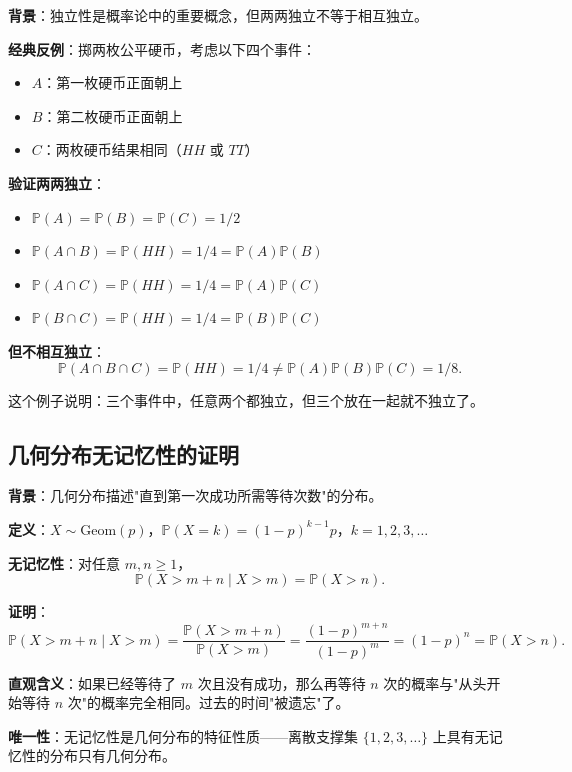 \textbf{背景}：独立性是概率论中的重要概念，但两两独立不等于相互独立。

\textbf{经典反例}：掷两枚公平硬币，考虑以下四个事件：
\begin{itemize}
\item $A$：第一枚硬币正面朝上
\item $B$：第二枚硬币正面朝上
\item $C$：两枚硬币结果相同（$HH$ 或 $TT$）
\end{itemize}

\textbf{验证两两独立}：
\begin{itemize}
\item $\mathbb{P}(A) = \mathbb{P}(B) = \mathbb{P}(C) = 1/2$
\item $\mathbb{P}(A \cap B) = \mathbb{P}(HH) = 1/4 = \mathbb{P}(A) \mathbb{P}(B)$
\item $\mathbb{P}(A \cap C) = \mathbb{P}(HH) = 1/4 = \mathbb{P}(A) \mathbb{P}(C)$
\item $\mathbb{P}(B \cap C) = \mathbb{P}(HH) = 1/4 = \mathbb{P}(B) \mathbb{P}(C)$
\end{itemize}

\textbf{但不相互独立}：
\[
\mathbb{P}(A \cap B \cap C) = \mathbb{P}(HH) = 1/4 \neq \mathbb{P}(A) \mathbb{P}(B) \mathbb{P}(C) = 1/8.
\]

这个例子说明：三个事件中，任意两个都独立，但三个放在一起就不独立了。

\subsection{几何分布无记忆性的证明}\label{sec:derivation-geometric-memoryless}

\textbf{背景}：几何分布描述"直到第一次成功所需等待次数"的分布。

\textbf{定义}：$X \sim \text{Geom}(p)$，$\mathbb{P}(X = k) = (1-p)^{k-1} p$，$k = 1, 2, 3, \ldots$

\textbf{无记忆性}：对任意 $m, n \geq 1$，
\[
\mathbb{P}(X > m+n \mid X > m) = \mathbb{P}(X > n).
\]

\textbf{证明}：
\[
\mathbb{P}(X > m+n \mid X > m) = \frac{\mathbb{P}(X > m+n)}{\mathbb{P}(X > m)} = \frac{(1-p)^{m+n}}{(1-p)^{m}} = (1-p)^{n} = \mathbb{P}(X > n).
\]

\textbf{直观含义}：如果已经等待了 $m$ 次且没有成功，那么再等待 $n$ 次的概率与"从头开始等待 $n$ 次"的概率完全相同。过去的时间"被遗忘"了。

\textbf{唯一性}：无记忆性是几何分布的特征性质——离散支撑集 $\{1, 2, 3, \ldots\}$ 上具有无记忆性的分布只有几何分布。

